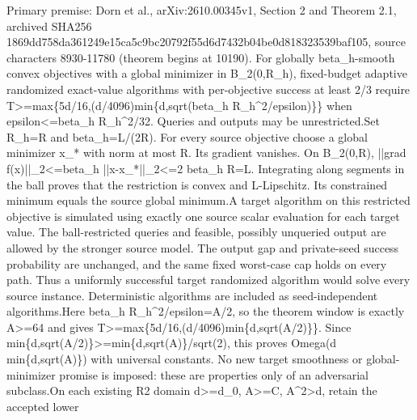 \documentclass[10pt,a4paper]{article}
\begin{document}
\begingroup\raggedright\sloppy Primary premise:\allowbreak{} Dorn et al.,\allowbreak{} arXiv:\allowbreak{}2610.00345v1,\allowbreak{} Section 2 and Theorem 2.1,\allowbreak{} archived SHA256 1869dd758da361249e15ca5c9bc20792f55d6d7432b04be0d818323539baf105,\allowbreak{} source characters 8930-11780 (theorem begins at 10190). For globally beta\_\allowbreak{}h-smooth convex objectives with a global minimizer in B\_\allowbreak{}2(0,\allowbreak{}R\_\allowbreak{}h),\allowbreak{} fixed-budget adaptive randomized exact-value algorithms with per-objective success at least 2/\allowbreak{}3 require T>=\allowbreak{}max\{5d/\allowbreak{}16,\allowbreak{}(d/\allowbreak{}4096)min\{d,\allowbreak{}sqrt(beta\_\allowbreak{}h R\_\allowbreak{}h\textasciicircum{}2/\allowbreak{}epsilon)\}\} when epsilon<=\allowbreak{}beta\_\allowbreak{}h R\_\allowbreak{}h\textasciicircum{}2/\allowbreak{}32. Queries and outputs may be unrestricted.\newline{}\newline{}Set R\_\allowbreak{}h=\allowbreak{}R and beta\_\allowbreak{}h=\allowbreak{}L/\allowbreak{}(2R). For every source objective choose a global minimizer x\_\allowbreak{}* with norm at most R. Its gradient vanishes. On B\_\allowbreak{}2(0,\allowbreak{}R),\allowbreak{} ||grad f(x)||\_\allowbreak{}2<=\allowbreak{}beta\_\allowbreak{}h ||x-x\_\allowbreak{}*||\_\allowbreak{}2<=\allowbreak{}2 beta\_\allowbreak{}h R=\allowbreak{}L. Integrating along segments in the ball proves that the restriction is convex and L-Lipschitz. Its constrained minimum equals the source global minimum.\newline{}\newline{}A target algorithm on this restricted objective is simulated using exactly one source scalar evaluation for each target value. The ball-restricted queries and feasible,\allowbreak{} possibly unqueried output are allowed by the stronger source model. The output gap and private-seed success probability are unchanged,\allowbreak{} and the same fixed worst-case cap holds on every path. Thus a uniformly successful target randomized algorithm would solve every source instance. Deterministic algorithms are included as seed-independent algorithms.\newline{}\newline{}Here beta\_\allowbreak{}h R\_\allowbreak{}h\textasciicircum{}2/\allowbreak{}epsilon=\allowbreak{}A/\allowbreak{}2,\allowbreak{} so the theorem window is exactly A>=\allowbreak{}64 and gives T>=\allowbreak{}max\{5d/\allowbreak{}16,\allowbreak{}(d/\allowbreak{}4096)min\{d,\allowbreak{}sqrt(A/\allowbreak{}2)\}\}. Since min\{d,\allowbreak{}sqrt(A/\allowbreak{}2)\}>=\allowbreak{}min\{d,\allowbreak{}sqrt(A)\}/\allowbreak{}sqrt(2),\allowbreak{} this proves Omega(d min\{d,\allowbreak{}sqrt(A)\}) with universal constants. No new target smoothness or global-minimizer promise is imposed:\allowbreak{} these are properties only of an adversarial subclass.\newline{}\newline{}On each existing R2 domain d>=\allowbreak{}d\_\allowbreak{}0,\allowbreak{} A>=\allowbreak{}C,\allowbreak{} A\textasciicircum{}2>d,\allowbreak{} retain the accepted lower 
\end{document}
